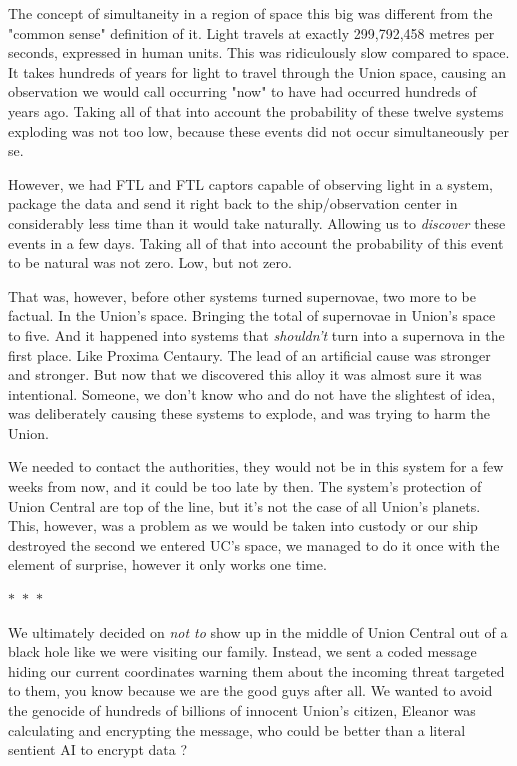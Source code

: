 \documentclass[colorlinks,12pt,a4paper]{book}
\newcommand\sep{\begin{center}
  \boldmath $\ast$~$\ast$~$\ast$
\end{center}}
\begin{document}
 The concept of simultaneity in a region of space this big was different from the "common sense" definition of it. Light travels at 
 exactly 299,792,458 metres per seconds, expressed in human units. This was ridiculously slow compared to space. It takes hundreds of years 
 for light to travel through the Union space, causing an observation we would call occurring "now" to have had occurred hundreds of years ago.
 Taking all of that into account the probability of these twelve systems exploding was not too low, because these events did not occur simultaneously
 per se.\par 
 \bigskip 
 
 However, we had FTL and FTL captors capable of observing light in a system, package the data and send it right back to the ship/observation 
 center in considerably less time than it would take naturally. Allowing us to \textit{discover} these events in a few days. Taking all of that 
 into account the probability of this event to be natural was not zero. Low, but not zero.\par 
 \bigskip 
 
 That was, however, before other systems turned supernovae, two more to be factual. In the Union's space. Bringing the total of supernovae in 
 Union's space to five. And it happened into systems that \textit{shouldn't} turn into a supernova in the first place. Like Proxima Centaury. 
 The lead of an artificial cause was stronger and stronger. But now that we discovered this alloy it was almost sure it was intentional. Someone, 
 we don't know who and do not have the slightest of idea, was deliberately causing these systems to explode, and was trying to harm the Union.\par 
 \bigskip
 
 We needed to contact the authorities, they would not be in this system for a few weeks from now, and it could be too late by then. The system's protection 
 of Union Central are top of the line, but it's not the case of all Union's planets. This, however, was a problem as we would be taken into custody or our ship 
 destroyed the second we entered UC's space, we managed to do it once with the element of surprise, however it only works one time.
 
 \sep
 
 We ultimately decided on \textit{not to} show up in the middle of Union Central out of a black hole like we were visiting our family. Instead, we 
 sent a coded message hiding our current coordinates warning them about the incoming threat targeted to them, you know because we are the good guys after 
 all. We wanted to avoid the genocide of hundreds of billions of innocent Union's citizen, Eleanor was calculating and encrypting the message, who could 
 be better than a literal sentient AI to encrypt data ? \par 
 \bigskip 
 
\end{document}
